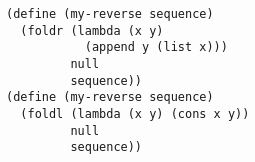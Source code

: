 \documentclass[a4paper,12pt]{article}
\begin{document}
\begin{lstlisting}
(define (my-reverse sequence)
  (foldr (lambda (x y)
           (append y (list x)))
         null
         sequence))
(define (my-reverse sequence)
  (foldl (lambda (x y) (cons x y))
         null
         sequence))
\end{lstlisting}
\end{document}
